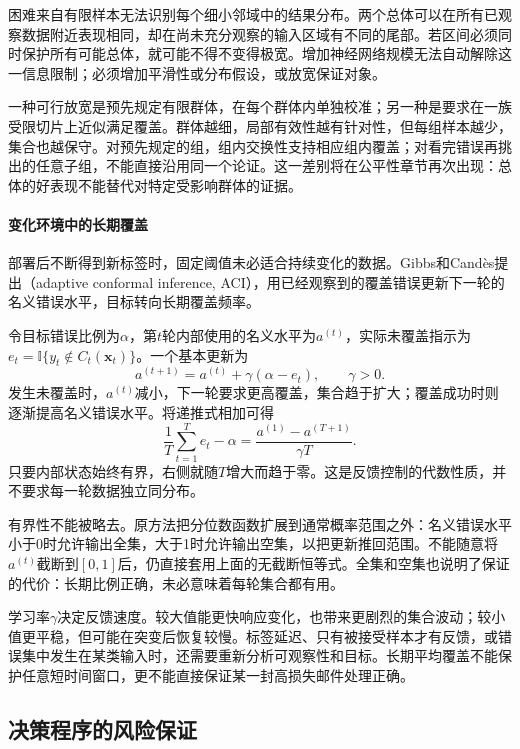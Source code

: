 困难来自有限样本无法识别每个细小邻域中的结果分布。两个总体可以在所有已观察数据附近表现相同，却在尚未充分观察的输入区域有不同的尾部。若区间必须同时保护所有可能总体，就可能不得不变得极宽。增加神经网络规模无法自动解除这一信息限制；必须增加平滑性或分布假设，或放宽保证对象。

一种可行放宽是预先规定有限群体，在每个群体内单独校准；另一种是要求在一族受限切片上近似满足覆盖。群体越细，局部有效性越有针对性，但每组样本越少，集合也越保守。对预先规定的组，组内交换性支持相应组内覆盖；对看完错误再挑出的任意子组，不能直接沿用同一个论证。这一差别将在公平性章节再次出现：总体的好表现不能替代对特定受影响群体的证据。

\paragraph{变化环境中的长期覆盖}

部署后不断得到新标签时，固定阈值未必适合持续变化的数据。Gibbs和Candès提出（adaptive conformal inference, ACI），用已经观察到的覆盖错误更新下一轮的名义错误水平，目标转向长期覆盖频率。

令目标错误比例为$\alpha$，第$t$轮内部使用的名义水平为$a^{(t)}$，实际未覆盖指示为$e_t=\mathbb I\{y_t\notin C_t(\bm{x}_t)\}$。一个基本更新为
\begin{equation}
 a^{(t+1)}=a^{(t)}+\gamma(\alpha-e_t),
 \qquad \gamma>0.
 \label{eq:reliability-aci}
\end{equation}
发生未覆盖时，$a^{(t)}$减小，下一轮要求更高覆盖，集合趋于扩大；覆盖成功时则逐渐提高名义错误水平。将递推式相加可得
\[
 \frac1T\sum_{t=1}^{T}e_t-\alpha
 =\frac{a^{(1)}-a^{(T+1)}}{\gamma T}.
\]
只要内部状态始终有界，右侧就随$T$增大而趋于零。这是反馈控制的代数性质，并不要求每一轮数据独立同分布。

有界性不能被略去。原方法把分位数函数扩展到通常概率范围之外：名义错误水平小于0时允许输出全集，大于1时允许输出空集，以把更新推回范围。不能随意将$a^{(t)}$截断到$[0,1]$后，仍直接套用上面的无截断恒等式。全集和空集也说明了保证的代价：长期比例正确，未必意味着每轮集合都有用。

学习率$\gamma$决定反馈速度。较大值能更快响应变化，也带来更剧烈的集合波动；较小值更平稳，但可能在突变后恢复较慢。标签延迟、只有被接受样本才有反馈，或错误集中发生在某类输入时，还需要重新分析可观察性和目标。长期平均覆盖不能保护任意短时间窗口，更不能直接保证某一封高损失邮件处理正确。

\subsection{决策程序的风险保证}


